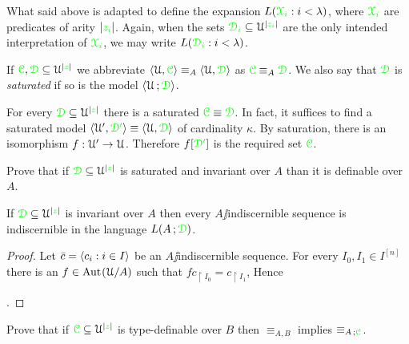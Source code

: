 \documentclass[creche.tex]{subfiles}
\begin{document}
What said above is adapted to define the expansion  \emph{$L({\color{green}\EuScript X_i}:i<\lambda)$}, where ${\color{green}\EuScript X_i}$ are predicates of arity $|{\color{green} z_i}|$. Again, when the sets ${\color{green}\EuScript D_i}\subseteq\EuScript U^{|{\color{green} z_i}|}$ are the only intended interpretation of  ${\color{green}\EuScript X_i}$, we may write \emph{$L({\color{green}\EuScript D_i}:i<\lambda)$}.

\begin{definition}\label{def_ins_sat}
  If ${\color{green}\EuScript C},{\color{green}\EuScript D}\subseteq\EuScript U^{|{\color{green} z}|}$ we abbreviate $\langle\EuScript U,{\color{green}\EuScript C}\rangle\equiv_A\langle\EuScript U,{\color{green}\EuScript D}\rangle$ as ${\color{green}\EuScript C}\equiv_A{\color{green}\EuScript D}$. We also say that ${\color{green}\EuScript D}$ is \emph{saturated\/} if so is the model $\langle\EuScript U\,;{\color{green}\EuScript D}\rangle$.\QED
\end{definition}

\begin{remark}\label{rem_el_sat}
For every ${\color{green}\EuScript D}\subseteq\EuScript U^{|{\color{green} z}|}$ there is a saturated ${\color{green}\EuScript C}\equiv{\color{green}\EuScript D}$. In fact, it suffices to find a saturated model $\langle\EuScript U',{\color{green}\EuScript D'}\rangle\equiv\langle\EuScript U,{\color{green}\EuScript D}\rangle$ of cardinality $\kappa$. By saturation, there is an isomorphism $f:\EuScript U'\to\EuScript U$. Therefore $f[{\color{green}\EuScript D'}]$ is the required set ${\color{green}\EuScript C}$.\QED
\end{remark}

\begin{exercise}
Prove that if ${\color{green}\EuScript D}\subseteq\EuScript U^{|{\color{green} z}|}$ is saturated and invariant over $A$ than it is definable over $A$.\QED
\end{exercise} 

\begin{proposition}\label{prop_indiscernible_L(A,D)}
If ${\color{green}\EuScript D}\subseteq\EuScript U^{|{\color{green} z}|}$ is invariant over $A$ then every $A\jj$indiscernible sequence is indiscernible in the language $L(A\,;{\color{green}\EuScript D})$.
\end{proposition}

\begin{proof}
Let $\bar c=\langle c_i:i\in I\rangle$ be an $A\jj$indiscernible sequence. For every $I_0,I_1\in I^{[n]}$ there is an $f\in{\rm Aut\kern.15ex}(\EuScript U/A)$ such that $fc_{\restriction I_0}=c_{\restriction I_1}$, Hence 

.
\end{proof}


\begin{exercise}
Prove that if ${\color{green}\EuScript C}\subseteq\EuScript U^{|{\color{green} z}|}$ is type-definable over $B$ then $\equiv_{A,B}$ implies $\equiv_{A\,;{\color{green}\EuScript C}}$.\QED
\end{exercise} 
\end{document}
